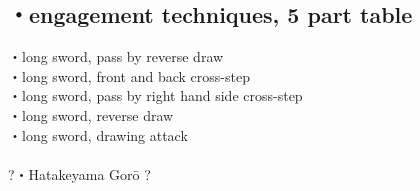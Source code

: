 \documentclass[dvipdfmx, a4paper, 12pt]{utarticle}
\begin{document}
\begin{CJK*}{UTF8}{min}
\begin{landscape}
\section{・engagement techniques, 5 part table}
\noindent {}・long sword, pass by reverse draw\\
・long sword, front and back cross-step\\
・long sword, pass by right hand side cross-step\\
・long sword, reverse draw\\
・long sword, drawing attack\\
\\
?・Hatakeyama Gor\={o} ?

\end{landscape}
\end{CJK*}
\end{document}
